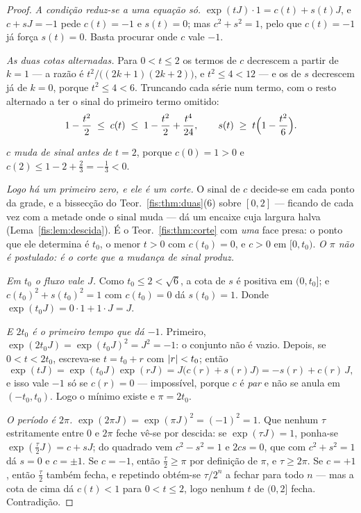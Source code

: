 \documentclass[livro.tex]{subfiles}
\begin{document}
\begin{proof}
\emph{A condição reduz-se a uma equação só.} $\exp(tJ)\cdot1=c(t)+s(t)J$, e
$c+sJ=-1$ pede $c(t)=-1$ e $s(t)=0$; mas $c^{2}+s^{2}=1$, pelo que $c(t)=-1$ já
força $s(t)=0$. Basta procurar onde $c$ vale $-1$.

\emph{As duas cotas alternadas.} Para $0<t\le2$ os termos de $c$ decrescem a
partir de $k=1$ --- a razão é $t^{2}/\bigl((2k{+}1)(2k{+}2)\bigr)$, e
$t^{2}\le4<12$ --- e os de $s$ decrescem já de $k=0$, porque $t^{2}\le4<6$.
Truncando cada série num termo, com o resto alternado a ter o sinal do primeiro
termo omitido:
\[
1-\frac{t^{2}}{2}\;\le\;c(t)\;\le\;1-\frac{t^{2}}{2}+\frac{t^{4}}{24},
\qquad
s(t)\;\ge\;t\Bigl(1-\frac{t^{2}}{6}\Bigr) .
\]

\emph{$c$ muda de sinal antes de $t=2$}, porque $c(0)=1>0$ e
$c(2)\le1-2+\tfrac{2}{3}=-\tfrac13<0$.

\emph{Logo há um primeiro zero, e ele é um corte.} O sinal de $c$ decide-se em
cada ponto da grade, e a bissecção do Teor.~\ref{fis:thm:duas}(6) sobre $[0,2]$
--- ficando de cada vez com a metade onde o sinal muda --- dá um encaixe cuja
largura halva (Lema~\ref{fis:lem:descida}). É o Teor.~\ref{fis:thm:corte} com
\emph{uma} face presa: o ponto que ele determina é $t_0$, o menor $t>0$ com
$c(t_0)=0$, e $c>0$ em $[0,t_0)$. \emph{O $\pi$ não é postulado: é o corte que a
mudança de sinal produz.}

\emph{Em $t_0$ o fluxo vale $J$.} Como $t_0\le2<\sqrt6$, a cota de $s$ é positiva
em $(0,t_0]$; e $c(t_0)^{2}+s(t_0)^{2}=1$ com $c(t_0)=0$ dá $s(t_0)=1$. Donde
$\exp(t_0J)=0\cdot1+1\cdot J=J$.

\emph{E $2t_0$ é o primeiro tempo que dá $-1$.} Primeiro,
$\exp(2t_0J)=\exp(t_0J)^{2}=J^{2}=-1$: o conjunto não é vazio. Depois, se
$0<t<2t_0$, escreva-se $t=t_0+r$ com $\lvert r\rvert<t_0$; então
\[
\exp(tJ)=\exp(t_0J)\exp(rJ)=J\bigl(c(r)+s(r)J\bigr)=-s(r)+c(r)\,J ,
\]
e isso vale $-1$ só se $c(r)=0$ --- impossível, porque $c$ é \emph{par} e não se
anula em $(-t_0,t_0)$. Logo o mínimo existe e $\pi=2t_0$.

\emph{O período é $2\pi$.} $\exp(2\pi J)=\exp(\pi J)^{2}=(-1)^{2}=1$. Que nenhum
$\tau$ estritamente entre $0$ e $2\pi$ feche vê-se por descida: se $\exp(\tau J)=1$, ponha-se
$\exp(\tfrac{\tau}{2}J)=c+sJ$; do quadrado vem $c^{2}-s^{2}=1$ e $2cs=0$, que com
$c^{2}+s^{2}=1$ dá $s=0$ e $c=\pm1$. Se $c=-1$, então $\tfrac{\tau}{2}\ge\pi$ por
definição de $\pi$, e $\tau\ge2\pi$. Se $c=+1$, então $\tfrac{\tau}{2}$ também
fecha, e repetindo obtém-se $\tau/2^{n}$ a fechar para todo $n$ --- mas a cota de
cima dá $c(t)<1$ para $0<t\le2$, logo nenhum $t$ de $(0,2]$ fecha. Contradição.
\end{proof}
\end{document}
